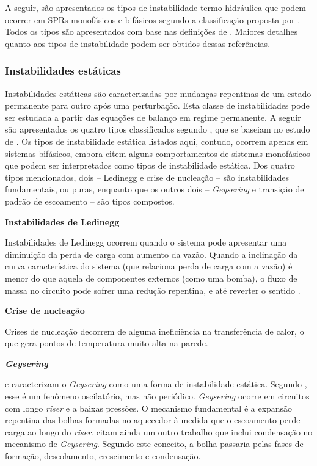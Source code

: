 \documentclass[a4paper,portuguese,10pt]{article}
\begin{document}
A seguir, são apresentados os tipos de instabilidade termo-hidráulica que podem ocorrer em SPRs monofásicos e bifásicos segundo a classificação proposta por \citet{PRASAD07}. Todos os tipos são apresentados com base nas definições de \cite{BOURE73,VIJAYAN05b,PRASAD07}. Maiores detalhes quanto aos tipos de instabilidade podem ser obtidos dessas referências.

\begin{figure}[b]
  
  \label{fig_instab_types}
\end{figure}

\subsubsection{Instabilidades estáticas}

Instabilidades estáticas são caracterizadas por mudanças repentinas de um estado permanente para outro após uma perturbação. Esta classe de instabilidades pode ser estudada a partir das equações de balanço em regime permanente. A seguir são apresentados os quatro tipos classificados segundo \citet{PRASAD07}, que se baseiam no estudo de \citet{BOURE73}. Os tipos de instabilidade estática listados aqui, contudo, ocorrem apenas em sistemas bifásicos, embora \citet{VIJAYAN05b} citem alguns comportamentos de sistemas monofásicos que podem ser interpretados como tipos de instabilidade estática. Dos quatro tipos mencionados, dois -- Ledinegg e crise de nucleação -- são instabilidades fundamentais, ou puras, enquanto que os outros dois -- {\it Geysering} e transição de padrão de escoamento -- são tipos compostos.

\textbf{Instabilidades de Ledinegg}

Instabilidades de Ledinegg ocorrem quando o sistema pode apresentar uma diminuição da perda de carga com aumento da vazão. Quando a inclinação da curva característica do sistema (que relaciona perda de carga com a vazão) é menor do que aquela de componentes externos (como uma bomba), o fluxo de massa no circuito pode sofrer uma redução repentina, e até reverter o sentido \cite{BOURE73,PRASAD07}.

\textbf{Crise de nucleação}

Crises de nucleação decorrem de alguma ineficiência na transferência de calor, o que gera pontos de temperatura muito alta na parede.

{\it\textbf{Geysering}}

\citet{PRASAD07} e \citet{BOURE73} caracterizam o {\it Geysering} como uma forma de instabilidade estática. Segundo \citet{VIJAYAN05b}, esse é um fenômeno oscilatório, mas não periódico. {\it Geysering} ocorre em circuitos com longo {\it riser} e a baixas pressões. O mecanismo fundamental é a expansão repentina das bolhas formadas no aquecedor à medida que o escoamento perde carga ao longo do {\it riser}. \citet{VIJAYAN05b} citam ainda um outro trabalho que inclui condensação no mecanismo de {\it Geysering}. Segundo este conceito, a bolha passaria pelas fases de formação, descolamento, crescimento e condensação.
\end{document}
